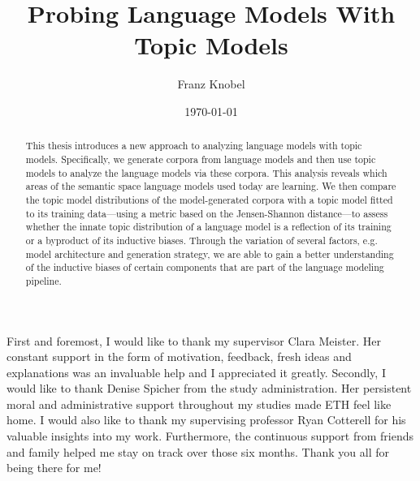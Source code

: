 \documentclass[a4paper, oneside]{thesis}
\title{Probing Language Models With Topic Models}
\author{Franz Knobel}
\institute{Rycolab\\[2pt]
Computational Linguistics, Natural Language Processing and Machine Learning\\[2pt]
ETH Zürich}
\date{\today}
\begin{document}
\frontmatter %
\maketitle

\cleardoublepage

\begin{acknowledgements}
First and foremost, I would like to thank my supervisor Clara Meister. Her constant support in the form of motivation, feedback, fresh ideas and explanations was an invaluable help and I appreciated it greatly. 
Secondly, I would like to thank Denise Spicher from the study administration. Her persistent moral and administrative support throughout my studies made ETH feel like home. 
I would also like to thank my supervising professor Ryan Cotterell for his valuable insights into my work. 
Furthermore, the continuous support from friends and family helped me stay on track over those six months. Thank you all for being there for me!
\end{acknowledgements}


\begin{abstract}
This thesis introduces a new approach to analyzing language models with topic models. Specifically, we generate corpora from language models and then use topic models to analyze the language models via these corpora. This analysis reveals which areas of the semantic space language models used today are learning. We then compare the topic model distributions of the model-generated corpora with a topic model fitted to its training data---using a metric based on the Jensen-Shannon distance---to assess whether the innate topic distribution of a language model is a reflection of its training or a byproduct of its inductive biases. Through the variation of several factors, e.g. model architecture and generation strategy, we are able to gain a better understanding of the inductive biases of certain components that are part of the language modeling pipeline. 
\end{abstract}

\tableofcontents

\mainmatter %










%

\end{document}
